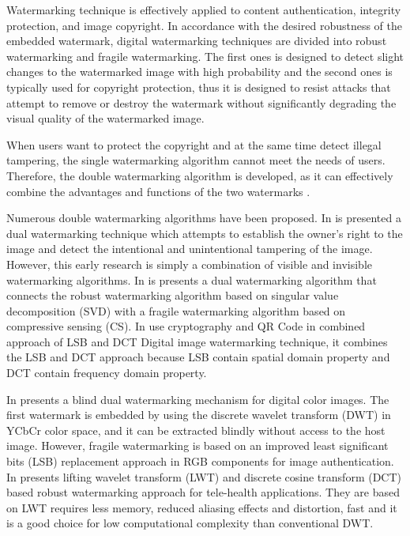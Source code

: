 \documentclass[runningheads]{llncs}
\begin{document}
Watermarking technique is effectively applied to content authentication, integrity protection, and image copyright. In accordance with the desired robustness of the embedded watermark, digital watermarking techniques are divided into robust watermarking and fragile watermarking. The first ones is designed to detect slight changes to the watermarked image with high probability and the second ones is typically used for copyright protection, thus it is designed to resist attacks that attempt to remove or destroy the watermark without significantly degrading the visual quality of the watermarked image.

When users want to protect the copyright and at the same time detect illegal tampering, the single watermarking algorithm cannot meet the needs of users. Therefore, the double watermarking algorithm is developed, as it can effectively combine the advantages and functions of the two watermarks \cite{wang2017dual}.

Numerous double watermarking algorithms have been proposed. In \cite{mohanty1999dual} is presented a dual watermarking technique which attempts to establish the owner’s right to the image and detect the intentional and unintentional tampering of the image. However, this early research is simply a combination of visible and invisible watermarking algorithms. In \cite{wang2017dual} is presents a dual watermarking algorithm that connects the robust watermarking algorithm based on singular value decomposition (SVD) with a fragile watermarking algorithm based on compressive sensing (CS). In \cite{singh2018hybrid} use cryptography and QR Code in combined approach of LSB and DCT Digital image watermarking technique, it combines the LSB and DCT approach because LSB contain spatial domain property and DCT contain frequency domain property.

In \cite{liu2018blind} presents a blind dual watermarking mechanism for digital color images. The first watermark is embedded by using the discrete wavelet transform (DWT) in YCbCr color space, and it can be extracted blindly without access to the host image. However, fragile watermarking is based on an improved least significant bits (LSB) replacement approach in RGB components for image authentication. In \cite{singh2019robust} presents lifting wavelet transform (LWT) and discrete cosine transform (DCT) based robust watermarking approach for tele-health applications. They are based on LWT requires less memory, reduced aliasing effects and distortion, fast and it is a good choice for low computational complexity than conventional DWT.
\end{document}
